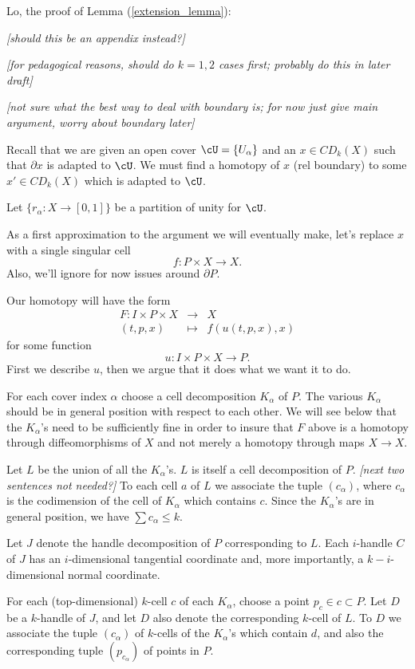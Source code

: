 \documentclass[11pt,leqno]{amsart}
\def\bd{\partial}
\def\sub{\subset}
\def\nn#1{{{\it \small [#1]}}}
\newcommand{\eq}[1]{\begin{displaymath}#1\end{displaymath}}
\newcommand{\eqar}[1]{\begin{eqnarray*}#1\end{eqnarray*}}
\begin{document}
Lo, the proof of Lemma (\ref{extension_lemma}):

\nn{should this be an appendix instead?}

\nn{for pedagogical reasons, should do $k=1,2$ cases first; probably do this in
later draft}

\nn{not sure what the best way to deal with boundary is; for now just give main argument, worry
about boundary later}

Recall that we are given
an open cover $\cU = \{U_\alpha\}$ and an
$x \in CD_k(X)$ such that $\bd x$ is adapted to $\cU$.
We must find a homotopy of $x$ (rel boundary) to some $x' \in CD_k(X)$ which is adapted to $\cU$.

Let $\{r_\alpha : X \to [0,1]\}$ be a partition of unity for $\cU$.

As a first approximation to the argument we will eventually make, let's replace $x$
with a single singular cell
\eq{
    f: P \times X \to X .
}
Also, we'll ignore for now issues around $\bd P$.

Our homotopy will have the form
\eqar{
    F: I \times P \times X &\to& X \\
    (t, p, x) &\mapsto& f(u(t, p, x), x)
}
for some function
\eq{
    u : I \times P \times X \to P .
}
First we describe $u$, then we argue that it does what we want it to do.

For each cover index $\alpha$ choose a cell decomposition $K_\alpha$ of $P$.
The various $K_\alpha$ should be in general position with respect to each other.
We will see below that the $K_\alpha$'s need to be sufficiently fine in order
to insure that $F$ above is a homotopy through diffeomorphisms of $X$ and not
merely a homotopy through maps $X\to X$.

Let $L$ be the union of all the $K_\alpha$'s.
$L$ is itself a cell decomposition of $P$.
\nn{next two sentences not needed?}
To each cell $a$ of $L$ we associate the tuple $(c_\alpha)$,
where $c_\alpha$ is the codimension of the cell of $K_\alpha$ which contains $c$.
Since the $K_\alpha$'s are in general position, we have $\sum c_\alpha \le k$.

Let $J$ denote the handle decomposition of $P$ corresponding to $L$.
Each $i$-handle $C$ of $J$ has an $i$-dimensional tangential coordinate and,
more importantly, a $k{-}i$-dimensional normal coordinate.

For each (top-dimensional) $k$-cell $c$ of each $K_\alpha$, choose a point $p_c \in c \sub P$.
Let $D$ be a $k$-handle of $J$, and let $D$ also denote the corresponding
$k$-cell of $L$.
To $D$ we associate the tuple $(c_\alpha)$ of $k$-cells of the $K_\alpha$'s
which contain $d$, and also the corresponding tuple $(p_{c_\alpha})$ of points in $P$.
\end{document}

